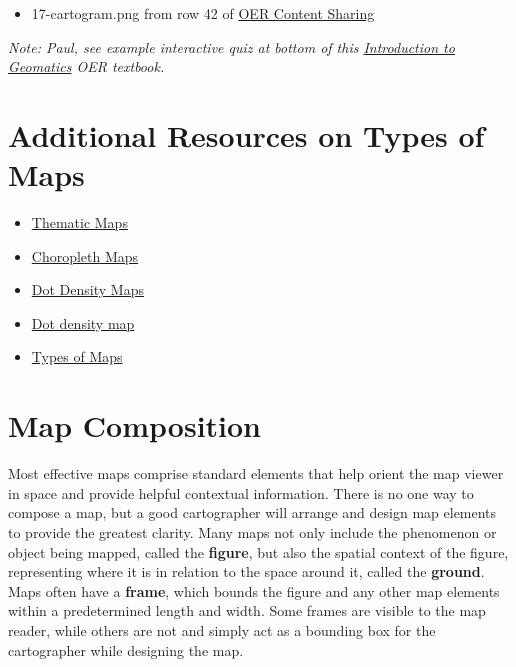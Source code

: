 \documentclass[
]{book}
\providecommand{\tightlist}{%
  \setlength{\itemsep}{0pt}\setlength{\parskip}{0pt}}
\begin{document}
\begin{itemize}
\tightlist
\item
  17-cartogram.png from row 42 of \href{https://docs.google.com/spreadsheets/d/1LqzXn00wMeIjHWstNT3tMImNDZirLGc3g72jFOQc_8I/edit\#gid=817407192}{OER Content Sharing}
\end{itemize}

\emph{Note: Paul, see example interactive quiz at bottom of this \href{https://openpress.usask.ca/introgeomatics/chapter/thematic-maps/}{Introduction to Geomatics} OER textbook.}

\hypertarget{additional-resources-on-types-of-maps}{%
\section{Additional Resources on Types of Maps}\label{additional-resources-on-types-of-maps}}

\begin{itemize}
\tightlist
\item
  \href{https://openpress.usask.ca/introgeomatics/chapter/thematic-maps/}{Thematic Maps}
\item
  \href{https://www.axismaps.com/guide/choropleth}{Choropleth Maps}
\item
  \href{https://www.axismaps.com/guide/dot-density}{Dot Density Maps}
\item
  \href{http://wiki.gis.com/wiki/index.php/Dot_density_map}{Dot density map}
\item
  \href{https://www.e-education.psu.edu/geog486/node/641}{Types of Maps}
\end{itemize}

\hypertarget{map-composition}{%
\section{Map Composition}\label{map-composition}}

Most effective maps comprise standard elements that help orient the map viewer in space and provide helpful contextual information. There is no one way to compose a map, but a good cartographer will arrange and design map elements to provide the greatest clarity. Many maps not only include the phenomenon or object being mapped, called the \textbf{figure}, but also the spatial context of the figure, representing where it is in relation to the space around it, called the \textbf{ground}. Maps often have a \textbf{frame}, which bounds the figure and any other map elements within a predetermined length and width. Some frames are visible to the map reader, while others are not and simply act as a bounding box for the cartographer while designing the map.
\end{document}
